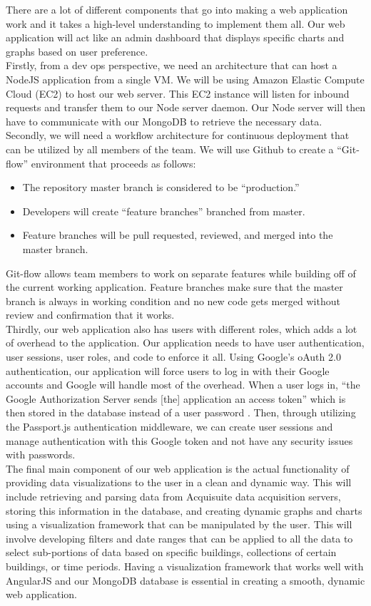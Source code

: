 There are a lot of different components that go into making a web application work and it takes a high-level understanding to implement them all. Our web application will act like an admin dashboard that displays specific charts and graphs based on user preference.\\
Firstly, from a dev ops perspective, we need an architecture that can host a NodeJS application from a single VM. We will be using Amazon Elastic Compute Cloud (EC2) to host our web server. This EC2 instance will listen for inbound requests and transfer them to our Node server daemon. Our Node server will then have to communicate with our MongoDB to retrieve the necessary data.\\
Secondly, we will need a workflow architecture for continuous deployment that can be utilized by all members of the team. We will use Github to create a ``Git-flow'' environment that proceeds as follows:
\begin{itemize}
    \item The repository master branch is considered to be ``production.''
    \item Developers will create ``feature branches'' branched from master.
    \item Feature branches will be pull requested, reviewed, and merged into the master branch.
\end{itemize}
Git-flow allows team members to work on separate features while building off of the current working application. Feature branches make sure that the master branch is always in working condition and no new code gets merged without review and confirmation that it works.\\
Thirdly, our web application also has users with different roles, which adds a lot of overhead to the application. Our application needs to have user authentication, user sessions, user roles, and code to enforce it all. Using Google's oAuth 2.0 authentication, our application will force users to log in with their Google accounts and Google will handle most of the overhead. When a user logs in, ``the Google Authorization Server sends [the] application an access token'' which is then stored in the database instead of a user password \cite{oauth}. Then, through utilizing the Passport.js authentication middleware, we can create user sessions and manage authentication with this Google token and not have any security issues with passwords.\\
The final main component of our web application is the actual functionality of providing data visualizations to the user in a clean and dynamic way. This will include retrieving and parsing data from Acquisuite data acquisition servers, storing this information in the database, and creating dynamic graphs and charts using a visualization framework that can be manipulated by the user. This will involve developing filters and date ranges that can be applied to all the data to select sub-portions of data based on specific buildings, collections of certain buildings, or time periods. Having a visualization framework that works well with AngularJS and our MongoDB database is essential in creating a smooth, dynamic web application. 
